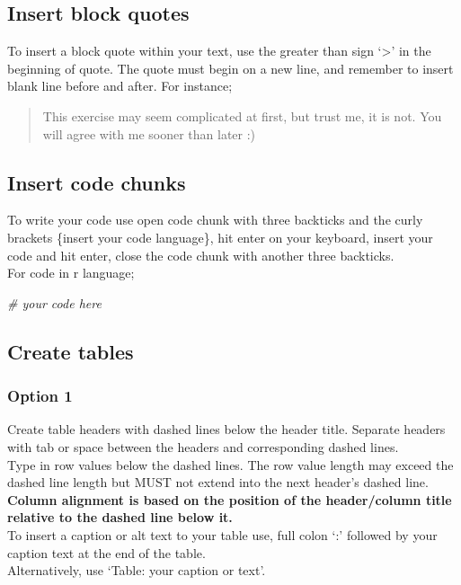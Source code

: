\documentclass[
]{book}
\newenvironment{Shaded}{\begin{snugshade}}{\end{snugshade}}
\newcommand{\CommentTok}[1]{\textcolor[rgb]{0.56,0.35,0.01}{\textit{#1}}}
\begin{document}
\hypertarget{insert-block-quotes}{%
\subsection{Insert block quotes}\label{insert-block-quotes}}

To insert a block quote within your text, use the greater than sign `\textgreater{}' in the beginning of quote. The quote must begin on a new line, and remember to insert blank line before and after. For instance;

\begin{quote}
This exercise may seem complicated at first,
but trust me, it is not. You will agree with me sooner than later :)
\end{quote}

\hypertarget{insert-code-chunks}{%
\subsection{Insert code chunks}\label{insert-code-chunks}}

To write your code use open code chunk with three backticks
and the curly brackets \{insert your code language\}, hit enter on your keyboard, insert your code and hit enter, close the code chunk with another three backticks.\\
For code in r language;

\begin{Shaded}
\begin{Highlighting}[]
\CommentTok{\# your code here}
\end{Highlighting}
\end{Shaded}

\hypertarget{create-tables}{%
\subsection{Create tables}\label{create-tables}}

\hypertarget{option-1}{%
\subsubsection{Option 1}\label{option-1}}

Create table headers with dashed lines below the header title. Separate headers with tab or space between the headers and corresponding dashed lines.\\
Type in row values below the dashed lines. The row value length may exceed the dashed line length but MUST not extend into the next header's dashed line.\\
\textbf{Column alignment is based on the position of the header/column title relative to the dashed line below it.}\\
To insert a caption or alt text to your table use, full colon `:' followed by your caption text at the end of the table.\\
Alternatively, use `Table: your caption or text'.
\end{document}
